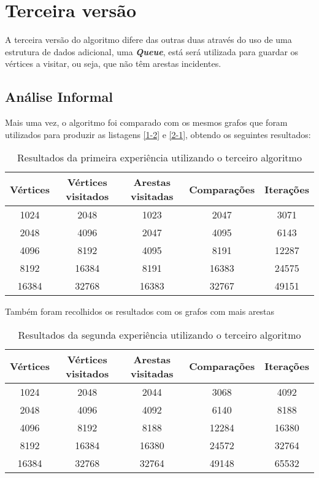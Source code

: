 \chapter{Terceira versão}

A terceira versão do algoritmo difere das outras duas através do uso de uma
estrutura de dados adicional, uma \textbf{\textit{Queue}}, está será utilizada
para guardar os vértices a visitar, ou seja, que não têm arestas incidentes.

\section{Análise Informal}

Mais uma vez, o algoritmo foi comparado com os mesmos grafos que foram utilizados
para produzir as listagens \ref{1-2} e \ref{2-1}, obtendo os seguintes resultados:

\begin{table}[H]
	\centering
	\begin{tabular}{| c || c | c | c | c |}
		\hline
		Vértices & Vértices visitados & Arestas visitadas & Comparações & Iterações \\
		\hline\hline
		1024     & 2048               & 1023              & 2047        & 3071      \\
		2048     & 4096               & 2047              & 4095        & 6143      \\
		4096     & 8192               & 4095              & 8191        & 12287     \\
		8192     & 16384              & 8191              & 16383       & 24575     \\
		16384    & 32768              & 16383             & 32767       & 49151     \\
		\hline
	\end{tabular}
	\caption{Resultados da primeira experiência utilizando o terceiro algoritmo}
\end{table}

Também foram recolhidos os resultados com os grafos com mais arestas

\begin{table}[H]
	\centering
	\begin{tabular}{| c || c | c | c | c |}
		\hline
		Vértices & Vértices visitados & Arestas visitadas & Comparações & Iterações \\
		\hline\hline
		1024     & 2048               & 2044              & 3068        & 4092      \\
		2048     & 4096               & 4092              & 6140        & 8188      \\
		4096     & 8192               & 8188              & 12284       & 16380     \\
		8192     & 16384              & 16380             & 24572       & 32764     \\
		16384    & 32768              & 32764             & 49148       & 65532     \\
		\hline
	\end{tabular}
	\caption{Resultados da segunda experiência utilizando o terceiro algoritmo}
\end{table}


